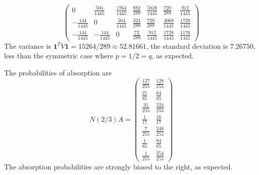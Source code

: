 \documentclass[12pt]{article}
\begin{document}
\begin{example}
\[\begin{pmatrix}
0 & \frac{504}{1445} & \frac{1764}{1445} & \frac{882}{289} & \frac{5838}{1445} & \frac{720}{289} & \frac{912}{1445}\\
-\frac{144}{1445} & 0 & \frac{504}{1445} & \frac{324}{289} & \frac{720}{289} & \frac{4068}{1445} & \frac{1728}{1445}\\
-\frac{144}{1445} & -\frac{144}{1445} & 0 & \frac{72}{289} & \frac{912}{1445} & \frac{1728}{1445} & \frac{1176}{1445}\end{pmatrix}\]
    The variance is \( \mathbf{1}^{T} V \mathbf{1} = 15264/289
    \approx 52.81661 \), the standard deviation is \( 7.26750 \), less
    than the symmetric case where \( p =1/2 = q \), as expected.

    The probabilities of absorption are
\[\]    \[
        N(2/3) A =
        \begin{pmatrix}
          \frac{127}{255} & \frac{128}{255} \\
          \frac{21}{85}   & \frac{64}{85}   \\
          \frac{31}{255}  & \frac{224}{255} \\
          \frac{1}{17}    & \frac{16}{17}   \\
          \frac{7}{255}   & \frac{248}{255} \\
          \frac{1}{85}    & \frac{84}{85}   \\
          \frac{1}{255}   & \frac{254}{255}
        \end{pmatrix}
    \] The absorption probabilities are strongly biased to the right, as
    expected.
\end{example}
\end{document}
